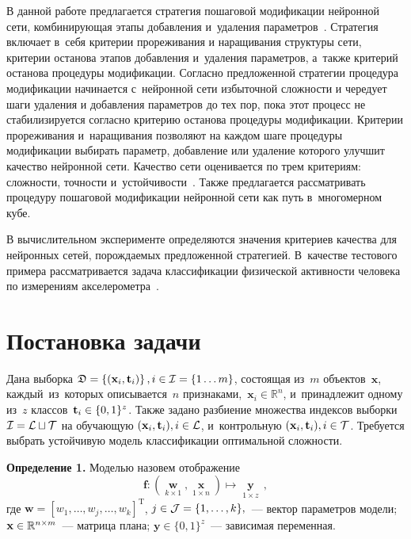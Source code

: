 \begin{multicols}{2}
В данной работе предлагается стратегия пошаговой модификации
нейронной сети, комбинирующая этапы добавления и~удаления
па\-ра\-мет\-ров~\cite{Knerr1990Stepwise, Strijov2013Evidence-1}. Стратегия включает
в~себя критерии прореживания и наращивания структуры сети, критерии
останова этапов добавления и~удаления параметров, а~также критерий
останова процедуры модификации. Согласно предложенной стратегии
процедура модификации начинается с~нейронной сети избыточной
сложности и чередует шаги удаления и добавления параметров до тех
пор, пока этот процесс не стабилизируется согласно критерию останова
процедуры модификации. Критерии прореживания и~наращивания позволяют
на каж\-дом шаге процедуры модификации выбирать параметр, добавление
или удаление которого улучшит качество нейронной сети. Качество сети
оценивается по трем критериям: сложности, точ\-ности
и~устойчивости~\cite{Tokmakova2012HyperPar, Leonteva2012Feature,
Zaycev2012Evaluation}. Также предлагается рассматривать процедуру
пошаговой модификации нейронной сети как путь в~многомерном кубе.

В вычислительном эксперименте определяются значения критериев
качества для нейронных сетей, порождаемых предложенной стратегией.
В~качестве тестового примера рассматривается задача классификации
физической активности человека по измерениям акселерометра~\cite{Kwapisz2010Activity}.

\section{Постановка задачи}

Дана выборка $\mathfrak{D} =\left\{ (\mathbf{x}_i,
\mathbf{t}_i) \right\}, i\in\mathcal{I}\hm=\{1 \dots m\}$,
состоящая из~$m$ объектов~$\mathbf{x}$, каждый~из~которых описывается~$n$
признаками,~$\mathbf{x}_i\in\mathbb{R}^n$,
и~принадлежит одному из~$z$ классов~$\mathbf{t}_i\hm\in\{0,1\}^z$.
Также задано разбиение множества индексов выборки $\mathcal{I} \hm
= \mathcal{L}\sqcup \mathcal {T}$ на обучающую
${(\mathbf{x}_i,\mathbf{t}_i)}, i \hm\in \mathcal{L}$,
и~контрольную ${(\mathbf{x}_i,\mathbf{t}_i)}, i \hm\in \mathcal{T}$.
Требуется выбрать устойчивую модель классификации оптимальной сложности.


\smallskip

\noindent
\textbf{Определение 1.}
Моделью назовем отображение
\begin{equation*}
\mathbf{f} : (\mathop{\mathbf{w}}\limits_{k \times 1},
\mathop{\mathbf{x}}\limits_{1 \times n}) \mapsto
\mathop{\mathbf{y}}\limits_{1 \times z}\,,
\end{equation*}
где $\mathbf{w} = \left[w_1, \dots,w_j,\dots,w_k\right]^{\mathrm{T}}$, $j \hm\in \mathcal{J} = \{1,\dots, k\},$~---
вектор параметров модели; $\mathbf{x} \hm\in \mathbb{R}^{n\times m}$~---
матрица плана; $\mathbf{y} \in \{0,1\}^z$~--- зависимая переменная.


\end{multicols}
